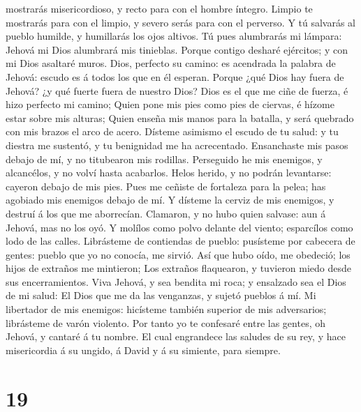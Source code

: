 mostrarás misericordioso, y recto para con el hombre íntegro.
 Limpio te mostrarás para con el limpio, y severo serás
para con el perverso.  Y tú salvarás al pueblo humilde, y
humillarás los ojos altivos.  Tú pues alumbrarás mi
lámpara: Jehová mi Dios alumbrará mis tinieblas.  Porque
contigo desharé ejércitos; y con mi Dios asaltaré muros. 
Dios, perfecto su camino: es acendrada la palabra de Jehová: escudo es á
todos los que en él esperan.  Porque ¿qué Dios hay fuera
de Jehová? ¿y qué fuerte fuera de nuestro Dios?  Dios es
el que me ciñe de fuerza, é hizo perfecto mi camino; 
Quien pone mis pies como pies de ciervas, é hízome estar sobre mis
alturas;  Quien enseña mis manos para la batalla, y será
quebrado con mis brazos el arco de acero.  Dísteme
asimismo el escudo de tu salud: y tu diestra me sustentó, y tu
benignidad me ha acrecentado.  Ensanchaste mis pasos
debajo de mí, y no titubearon mis rodillas.  Perseguido
he mis enemigos, y alcancélos, y no volví hasta acabarlos.
 Helos herido, y no podrán levantarse: cayeron debajo de
mis pies.  Pues me ceñiste de fortaleza para la pelea;
has agobiado mis enemigos debajo de mí.  Y dísteme la
cerviz de mis enemigos, y destruí á los que me aborrecían.
 Clamaron, y no hubo quien salvase: aun á Jehová, mas no
los oyó.  Y molílos como polvo delante del viento;
esparcílos como lodo de las calles.  Librásteme de
contiendas de pueblo: pusísteme por cabecera de gentes: pueblo que yo no
conocía, me sirvió.  Así que hubo oído, me obedeció; los
hijos de extraños me mintieron;  Los extraños flaquearon,
y tuvieron miedo desde sus encerramientos.  Viva Jehová,
y sea bendita mi roca; y ensalzado sea el Dios de mi salud:
 El Dios que me da las venganzas, y sujetó pueblos á mí.
 Mi libertador de mis enemigos: hicísteme también
superior de mis adversarios; librásteme de varón violento.
 Por tanto yo te confesaré entre las gentes, oh Jehová, y
cantaré á tu nombre.  El cual engrandece las saludes de
su rey, y hace misericordia á su ungido, á David y á su simiente, para
siempre.

\hypertarget{section-18}{%
\section{19}\label{section-18}}

